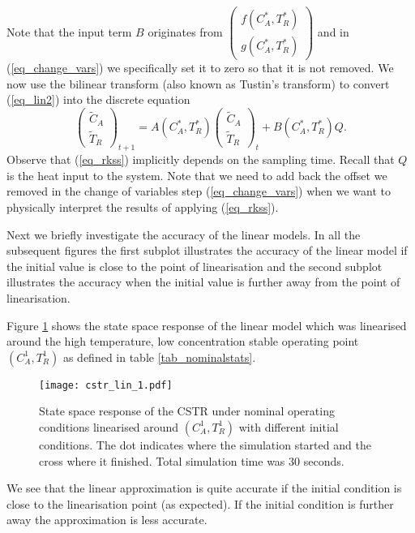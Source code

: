 Note that the input term $B$ originates from $\begin{pmatrix}
f(C_A^*, T_R^*) \\ g(C_A^*, T_R^*)
\end{pmatrix}$ and in (\ref{eq_change_vars}) we specifically set it to zero so that it is not removed. We now use the bilinear transform (also known as Tustin's transform) to convert (\ref{eq_lin2}) into the discrete equation
\begin{equation}
\begin{pmatrix}
\tilde{C}_A \\ \tilde{T}_R
\end{pmatrix}_{t+1} = A(C_A^*, T_R^*) \begin{pmatrix}
\tilde{C}_A \\ \tilde{T}_R
\end{pmatrix}_{t} + B(C_A^*, T_R^*)Q. 
\label{eq_rkss}
\end{equation}
Observe that (\ref{eq_rkss}) implicitly depends on the sampling time. Recall that $Q$ is the heat input to the system. Note that we need to add back the offset we removed in the change of variables step (\ref{eq_change_vars}) when we want to physically interpret the results of applying (\ref{eq_rkss}).

Next we briefly investigate the accuracy of the linear models. In all the subsequent figures the first subplot illustrates the accuracy of the linear model if the initial value is close to the point of linearisation and the second subplot illustrates the accuracy when the initial value is further away from the point of linearisation.

Figure \ref{fig_cstr_lin_1} shows the state space response of the linear model which was linearised around the high temperature, low concentration stable operating point $(C_A^1,T_R^1)$ as defined in table \ref{tab_nominalstats}.
\begin{figure}[H] 
\centering
\texttt{[image: cstr\_lin\_1.pdf]}
\caption{State space response of the CSTR under nominal operating conditions linearised around $(C_A^1,T_R^1)$ with different initial conditions. The dot indicates where the simulation started and the cross where it finished. Total simulation time was 30 seconds.}
\label{fig_cstr_lin_1}
\end{figure}
We see that the linear approximation is quite accurate if the initial condition is close to the linearisation point (as expected). If the initial condition is further away the approximation is less accurate.

